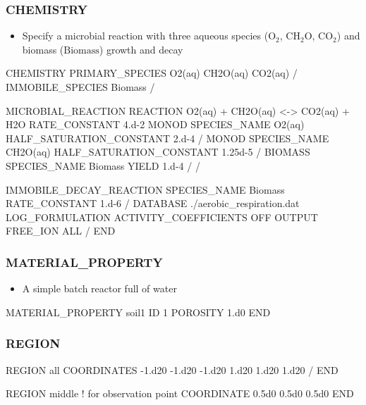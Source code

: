 \documentclass{beamer}
\newcommand{\oxygen}{{\text{O}_2}}
\newcommand{\organiccarbon}{{\text{CH}_2\text{O}}}
\newcommand{\carbondioxide}{{\text{CO}_2}}
\newcommand{\biomass}{{\text{Biomass}}}
\newcommand\bluecomment[1]{{{\color{blue} #1}}}
\begin{document}
\begin{frame}\frametitle{CHEMISTRY}

\begin{itemize}
  \item Specify a microbial reaction with three aqueous species ($\oxygen$, $\organiccarbon$, $\carbondioxide$) and biomass ($\biomass$) growth and decay
\end{itemize}

\begin{semiverbatim}

CHEMISTRY
  PRIMARY_SPECIES
    O2(aq)
    CH2O(aq)
    CO2(aq)
  /
  IMMOBILE_SPECIES
    Biomass
  /
\end{semiverbatim}
\newpage
\normalsize
\begin{semiverbatim}
  MICROBIAL_REACTION
    REACTION O2(aq) + CH2O(aq) <-> CO2(aq) + H2O
    RATE_CONSTANT 4.d-2
    MONOD
      SPECIES_NAME O2(aq)
      HALF_SATURATION_CONSTANT 2.d-4
    /
    MONOD
      SPECIES_NAME CH2O(aq)
      HALF_SATURATION_CONSTANT 1.25d-5
    /
    BIOMASS
      SPECIES_NAME Biomass
      YIELD 1.d-4
    /
  /
\end{semiverbatim}
\normalsize
\begin{semiverbatim}
  IMMOBILE_DECAY_REACTION
    SPECIES_NAME Biomass
    RATE_CONSTANT 1.d-6
  /
  DATABASE ./aerobic_respiration.dat
  LOG_FORMULATION
  ACTIVITY_COEFFICIENTS OFF
  OUTPUT
    FREE_ION
    ALL
  /
END
\end{semiverbatim}

\end{frame}


\begin{frame}[fragile]\frametitle{MATERIAL\_PROPERTY}

\begin{itemize}
  \item A simple batch reactor full of water
\end{itemize}

\begin{semiverbatim}


MATERIAL_PROPERTY soil1
  ID 1
  POROSITY 1.d0
END
\end{semiverbatim}

\end{frame}

\begin{frame}[fragile]\frametitle{REGION}

\begin{semiverbatim}

REGION all
  COORDINATES
    -1.d20 -1.d20 -1.d20
    1.d20 1.d20 1.d20
  /
END

REGION middle   \bluecomment{! for observation point}
  COORDINATE 0.5d0 0.5d0 0.5d0
END

\end{semiverbatim}

\end{frame}
\end{document}
